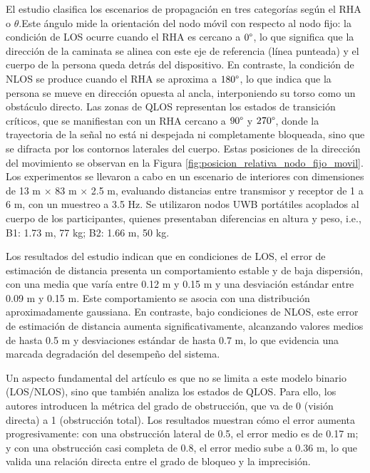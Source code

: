 \begin{enumerate}
    El estudio clasifica los escenarios de propagación en tres categorías según el RHA o $\theta$.Este ángulo mide la orientación del nodo móvil con respecto al nodo fijo: la condición de LOS ocurre cuando el RHA es cercano a $0\degree$, lo que significa que la dirección de la caminata se alinea con este eje de referencia (línea punteada) y el cuerpo de la persona queda detrás del dispositivo. En contraste, la condición de NLOS se produce cuando el RHA se aproxima a $180\degree$, lo que indica que la persona se mueve en dirección opuesta al ancla, interponiendo su torso como un obstáculo directo. Las zonas de QLOS representan los estados de transición críticos, que se manifiestan con un RHA cercano a $90\degree$ y $270\degree$, donde la trayectoria de la señal no está ni despejada ni completamente bloqueada, sino que se difracta por los contornos laterales del cuerpo. Estas posiciones de la dirección del movimiento se observan en la Figura \ref{fig:posicion_relativa_nodo_fijo_movil}. Los experimentos se llevaron a cabo en un escenario de interiores con dimensiones de 13 m $\times$ 83 m $\times$ 2.5 m, evaluando distancias entre transmisor y receptor de 1 a 6 m, con un muestreo a 3.5 Hz. Se utilizaron nodos UWB portátiles acoplados al cuerpo de los participantes, quienes presentaban diferencias en altura y peso, i.e., B1: 1.73 m, 77 kg; B2: 1.66 m, 50 kg.
     
    Los resultados del estudio indican que en condiciones de LOS, el error de estimación de distancia presenta un comportamiento estable y de baja dispersión, con una media que varía entre 0.12 m y 0.15 m y una desviación estándar entre 0.09 m y 0.15 m. Este comportamiento se asocia con una distribución aproximadamente gaussiana. En contraste, bajo condiciones de NLOS, este error de estimación de distancia aumenta significativamente, alcanzando valores medios de hasta 0.5 m y desviaciones estándar de hasta 0.7 m, lo que evidencia una marcada degradación del desempeño del sistema.

    Un aspecto fundamental del artículo es que no se limita a este modelo binario (LOS/NLOS), sino que también analiza los estados de QLOS. Para ello, los autores introducen la métrica del grado de obstrucción, que va de 0 (visión directa) a 1 (obstrucción total). Los resultados muestran cómo el error aumenta progresivamente: con una obstrucción lateral de 0.5, el error medio es de 0.17 m; y con una obstrucción casi completa de 0.8, el error medio sube a 0.36 m, lo que valida una relación directa entre el grado de bloqueo y la imprecisión.


\end{enumerate}
